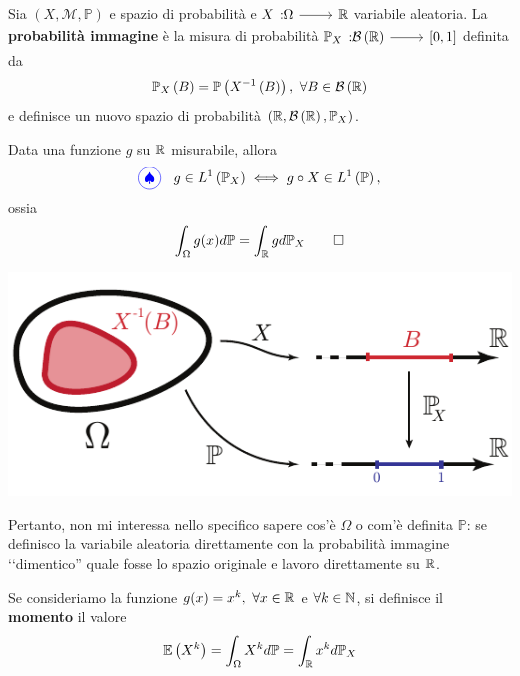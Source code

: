 \begin{define}
	Sia $\left(X,\mathcal{M},\mathbb{P}\right)$ e spazio di probabilità e $\funz{X}{\Omega}{\realset}$ variabile aleatoria.
	La \textbf{probabilità immagine} è la misura di probabilità $\funz{\mathbb{P}_X}{\mathcal{B}\left(\realset\right)}{\left[0,1\right]}$ definita da
	\begin{equation}
		\mathbb{P}_X\left(B\right)=\mathbb{P}\left(X^{-1}\left(B\right)\right),\ \forall B\in \mathcal{B\left(\realset\right)}
	\end{equation}
	e definisce un nuovo spazio di probabilità $\left(\mathbb{R},\mathcal{B}\left(\mathbb{R}\right),\mathbb{P}_X\right)$.
\end{define}
\begin{theoremaqed}
	Data una funzione $g$ su $\mathbb{R}$ misurabile, allora
	\begin{equation}
		\circled[blue]{\spadesuit}\quad g\in L^{1}\left(\mathbb{P}_X\right)\iff g\circ X\in L^{1}\left(\mathbb{P}\right),
	\end{equation}
	ossia
	\begin{equation}
		\int_{\Omega}g(x)d\mathbb{P}=\int_{\mathbb{R}}gd\mathbb{P}_X\qedhere
	\end{equation}
\end{theoremaqed}
\begin{center}
	\includegraphics[width=0.4\paperwidth]{images/probimmagine}
\end{center}
Pertanto, non mi interessa nello specifico sapere cos'è $\Omega$ o com'è definita $\mathbb{P}$: se definisco la variabile aleatoria direttamente con la probabilità immagine ‘‘dimentico'' quale fosse lo spazio originale e lavoro direttamente su $\mathbb{R}$.
\begin{define}
	Se consideriamo la funzione $g(x)=x^k,\ \forall x\in\realset$ e $\forall k\in\mathbb{N}$, si definisce il \textbf{momento} il valore
	\begin{equation*}
		\mathbb{E}\left(X^k\right)=\int_{\Omega}X^kd\mathbb{P}=\int_{\mathbb{R}}x^kd\mathbb{P}_X
	\end{equation*}
\end{define}
